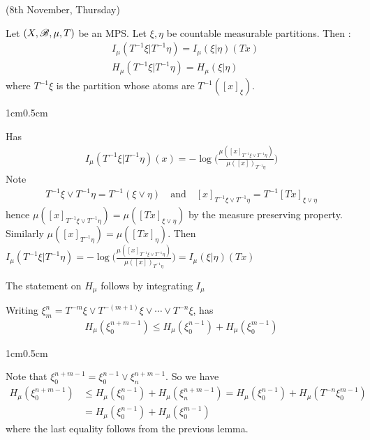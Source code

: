 \documentclass[10pt,a4paper]{report}
\newenvironment{proof}
{\begin{changemargin}{1cm}{0.5cm} 
	}%
	{\end{changemargin}
}
\begin{document}
\newday

(8th November, Thursday)
\s

\lem Let $(X,\mathscr{B}, \mu, T)$ be an MPS. Let $\xi, \eta$ be countable measurable partitions. Then :
\begin{align*}
& I_{\mu}(T^{-1}\xi | T^{-1} \eta ) = I_{\mu}(\xi | \eta)(Tx) \\
& H_{\mu}(T^{-1} \xi | T^{-1} \eta) = H_{\mu}(\xi | \eta)
\end{align*}
where $T^{-1} \xi$ is the partition whose atoms are $T^{-1}([x]_{\xi})$.

\begin{proof}
\pf Has 
\begin{align*}
I_{\mu}(T^{-1} \xi | T^{-1} \eta)(x)  = -\log \Big( \frac{\mu([x]_{T^{-1}\xi \vee T^{-1}\eta} )}{\mu([x])_{T^{-1}\eta}} \Big)
\end{align*}
Note
\begin{align*}
T^{-1} \xi \vee T^{-1}\eta = T^{-1}(\xi \vee \eta) \quad \text{and} \quad [x]_{T^{-1} \xi \vee T^{-1}\eta} = T^{-1} [Tx]_{\xi \vee \eta}
\end{align*}
hence $\mu([x]_{T^{-1} \xi \vee T^{-1}\eta}) = \mu([Tx]_{\xi \vee \eta})$ by the measure preserving property. Similarly $\mu([x]_{T^{-1}\eta}) = \mu ([Tx]_{\eta})$. Then $I_{\mu}(T^{-1}\xi | T^{-1} \eta ) = -\log \Big( \frac{\mu([x]_{T^{-1}\xi \vee T^{-1}\eta} )}{\mu([x])_{T^{-1}\eta}} \Big) =  I_{\mu}(\xi | \eta)(Tx)$

\quad The statement on $H_{\mu}$ follows by integrating $I_{\mu}$

\eop
\end{proof}
\s

\cor Writing $\xi_m^n = T^{-m} \xi \vee T^{-(m+1)}\xi \vee \cdots \vee T^{-n} \xi$, has
\begin{align*}
H_{\mu}(\xi_0^{n+m-1}) \leq H_{\mu}(\xi_0^{n-1}) + H_{\mu}(\xi_0^{m-1})
\end{align*}
\begin{proof}
\pf Note that $\xi_0^{n+m-1} = \xi_0^{n-1} \vee \xi_n^{n+m-1}$. So we have
\begin{align*}
H_{\mu}(\xi_0^{n+m-1}) &\leq H_{\mu}(\xi_0^{n-1})+ H_{\mu}(\xi_n^{n+m-1}) = H_{\mu}(\xi_0^{n-1}) + H_{\mu}(T^{-n}\xi_0^{m-1}) \\
&= H_{\mu}(\xi_0^{n-1}) + H_{\mu}(\xi_0^{m-1})
\end{align*}
where the last equality follows from the previous lemma.

\eop
\end{proof}
\s
\end{document}

